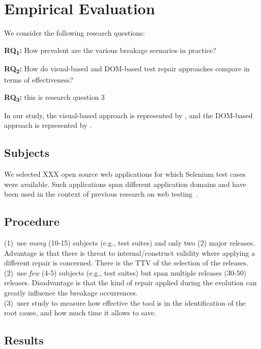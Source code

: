 
\section{Empirical Evaluation}\label{sec:evaluation}

We consider the following research questions:

\noindent
\textbf{RQ\textsubscript{1}:} How prevalent are the various breakage scenarios in practice?

\noindent
\textbf{RQ\textsubscript{2}:} How do visual-based and DOM-based test repair approaches compare in terms of effectiveness?

\noindent%
\textbf{RQ\textsubscript{3}:} this is research question 3

\noindent
In our study, the visual-based approach is represented by \tool, and the DOM-based approach is represented by \water.

\subsection{Subjects}\label{sec:subjects}

We selected XXX open source web applications for which Selenium test cases were available. Such applications span different application domains and have been used in the context of previous research on web testing~\cite{}.

\subsection{Procedure}\label{sec:procedure}

(1)~use \textit{many} (10-15) subjects (e.g., test suites) and only two (2) major releases. Advantage is that there is threat to internal/construct validity where applying a different repair is concerned. There is the TTV of the selection of the releases. \\

\noindent
(2)~use \textit{few} (4-5) subjects (e.g., test suites) but span multiple releases  (30-50) releases. Disadvantage is that the kind of repair applied during the evolution can greatly influence the breakage occurrences. \\

\noindent
(3)~user study to measure how effective the tool is in the identification of the root cause, and how much time it allows to save.

\subsection{Results}\label{sec:results}











